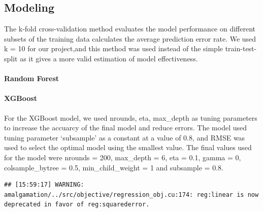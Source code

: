 \documentclass[11pt,]{article}
\begin{document}
\hypertarget{modeling}{%
\subsection{Modeling}\label{modeling}}

The k-fold cross-validation method evaluates the model performance on
different subsets of the training data calculates the average prediction
error rate. We used k = 10 for our project,and this method was used
instead of the simple train-test-split as it gives a more valid
estimation of model effectiveness.

\hypertarget{random-forest}{%
\paragraph{\texorpdfstring{\textbf{Random Forest}\\
}{Random Forest }}\label{random-forest}}

\hypertarget{xgboost}{%
\paragraph{\texorpdfstring{\textbf{XGBoost}\\
}{XGBoost }}\label{xgboost}}

For the XGBoost model, we used nrounds, eta, max\_depth as tuning
parameters to increase the accuarcy of the final model and reduce
errors. The model used tuning parameter `subsample' as a constant at a
value of 0.8, and RMSE was used to select the optimal model using the
smallest value. The final values used for the model were nrounds = 200,
max\_depth = 6, eta = 0.1, gamma = 0, colsample\_bytree = 0.5,
min\_child\_weight = 1 and subsample = 0.8.

\begin{verbatim}
## [15:59:17] WARNING: amalgamation/../src/objective/regression_obj.cu:174: reg:linear is now deprecated in favor of reg:squarederror.
\end{verbatim}
\end{document}

